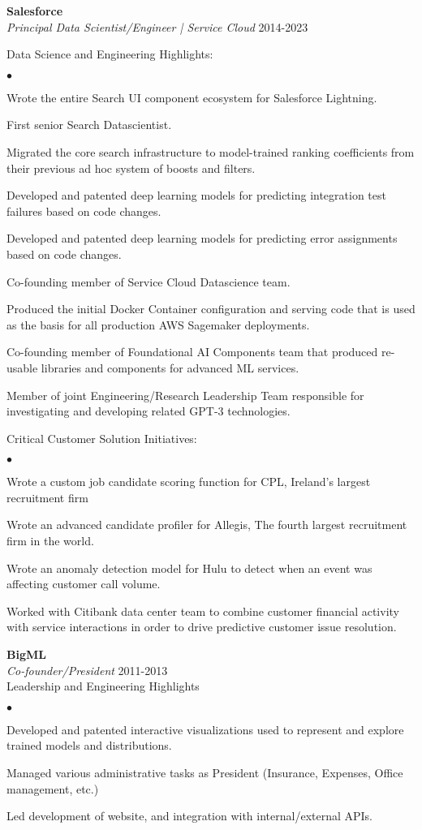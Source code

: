 \documentclass[margin,line]{res}
\newenvironment{list2}{
  \begin{list}{$\bullet$}{%
      \setlength{\itemsep}{0in}
      \setlength{\parsep}{0in} \setlength{\parskip}{0in}
      \setlength{\topsep}{0in} \setlength{\partopsep}{0in} 
      \setlength{\leftmargin}{0.2in}}}{\end{list}}
\begin{document}
\begin{resume}
{\bf Salesforce} \\
{\em Principal Data Scientist/Engineer | Service Cloud} \hfill 2014-2023

Data Science and Engineering Highlights:
\begin{list2}
  \item Wrote the entire Search UI component ecosystem for Salesforce Lightning.
  \item First senior Search Datascientist.
  \item Migrated the core search infrastructure to model-trained ranking coefficients from their previous ad hoc system of boosts and filters.
  \item Developed and patented deep learning models for predicting integration test failures based on code changes.
  \item Developed and patented deep learning models for predicting error assignments based on code changes.
  \item Co-founding member of Service Cloud Datascience team.
  \item Produced the initial Docker Container configuration and serving code that is used as the basis for all production AWS Sagemaker deployments.
  \item Co-founding member of Foundational AI Components team that produced re-usable libraries and components for advanced ML services.
  \item Member of joint Engineering/Research Leadership Team responsible for investigating and developing related GPT-3 technologies.
\end{list2}

Critical Customer Solution Initiatives:
  \begin{list2}
  \item Wrote a custom job candidate scoring function for CPL, Ireland’s largest recruitment firm
  \item Wrote an advanced candidate profiler for Allegis, The fourth largest recruitment firm in the world.
  \item Wrote an anomaly detection model for Hulu to detect when an event was affecting customer call volume.
  \item Worked with Citibank data center team to combine customer financial activity with service interactions in order to drive predictive customer issue resolution.
\end{list2}


{\bf BigML} \\
{\em Co-founder/President} \hfill 2011-2013\\
Leadership and Engineering Highlights
\begin{list2}
  \item Developed and patented interactive visualizations used to represent and explore trained models and distributions.
  \item Managed various administrative tasks as President (Insurance, Expenses, Office management, etc.)
  \item Led development of website, and integration with internal/external APIs.
\end{list2}



\end{resume}
\end{document}
